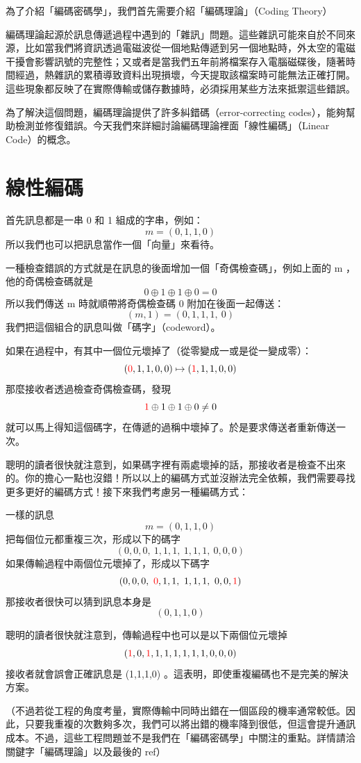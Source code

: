 \documentclass[
]{article}
\author{}
\date{}
\begin{document}
為了介紹「編碼密碼學」，我們首先需要介紹「編碼理論」（Coding Theory）

編碼理論起源於訊息傳遞過程中遇到的「雜訊」問題。這些雜訊可能來自於不同來源，比如當我們將資訊透過電磁波從一個地點傳遞到另一個地點時，外太空的電磁干擾會影響訊號的完整性；又或者是當我們五年前將檔案存入電腦磁碟後，隨著時間經過，熱雜訊的累積導致資料出現損壞，今天提取該檔案時可能無法正確打開。這些現象都反映了在實際傳輸或儲存數據時，必須採用某些方法來抵禦這些錯誤。

為了解決這個問題，編碼理論提供了許多糾錯碼（error-correcting
codes），能夠幫助檢測並修復錯誤。今天我們來詳細討論編碼理論裡面「線性編碼」（Linear
Code）的概念。

\hypertarget{ux7ddaux6027ux7de8ux78bc}{%
\section{線性編碼}\label{ux7ddaux6027ux7de8ux78bc}}

首先訊息都是一串 0 和 1 組成的字串，例如： \[
m = (0,1,1,0)
\] 所以我們也可以把訊息當作一個「向量」來看待。

一種檢查錯誤的方式就是在訊息的後面增加一個「奇偶檢查碼」，例如上面的 m
，他的奇偶檢查碼就是 \[
0 \oplus 1 \oplus 1\oplus 0 = 0
\] 所以我們傳送 m 時就順帶將奇偶檢查碼 0 附加在後面一起傳送： \[
(m, 1) = (0,1,1,1,\  0)
\] 我們把這個組合的訊息叫做「碼字」（codeword）。

如果在過程中，有其中一個位元壞掉了（從零變成一或是從一變成零）： \[
 ({\color{red}0},1,1,0, 0)
 \mapsto
 ({\color{red}1},1,1,0, 0)
\] 那麼接收者透過檢查奇偶檢查碼，發現 \[
{\color{red}1} \oplus 1 \oplus 1\oplus 0  \ne 0
\]
就可以馬上得知這個碼字，在傳遞的過稱中壞掉了。於是要求傳送者重新傳送一次。

聰明的讀者很快就注意到，如果碼字裡有兩處壞掉的話，那接收者是檢查不出來的。你的擔心一點也沒錯！所以以上的編碼方式並沒辦法完全依賴，我們需要尋找更多更好的編碼方式！接下來我們考慮另一種編碼方式：

一樣的訊息 \[
m = (0,1,1,0)
\] 把每個位元都重複三次，形成以下的碼字 \[
(0,0,0,\ 1,1,1,\ 1,1,1,\ 0,0,0)
\] 如果傳輸過程中兩個位元壞掉了，形成以下碼字 \[
(0,0,0,\ {\color{red}0},1,1,\ 1,1,1,\ 0,0,{\color{red}1})
\] 那接收者很快可以猜到訊息本身是 \[
(0,1,1,0)
\]

聰明的讀者很快就注意到，傳輸過程中也可以是以下兩個位元壞掉 \[
({\color{red}1},0,{\color{red}1},1,1,1,1,1,1,0,0,0)
\] 接收者就會誤會正確訊息是 (1,1,1,0)
。這表明，即使重複編碼也不是完美的解決方案。

（不過若從工程的角度考量，實際傳輸中同時出錯在一個區段的機率通常較低。因此，只要我重複的次數夠多次，我們可以將出錯的機率降到很低，但這會提升通訊成本。不過，這些工程問題並不是我們在「編碼密碼學」中關注的重點。詳情請洽關鍵字「編碼理論」以及最後的
ref）
\end{document}
